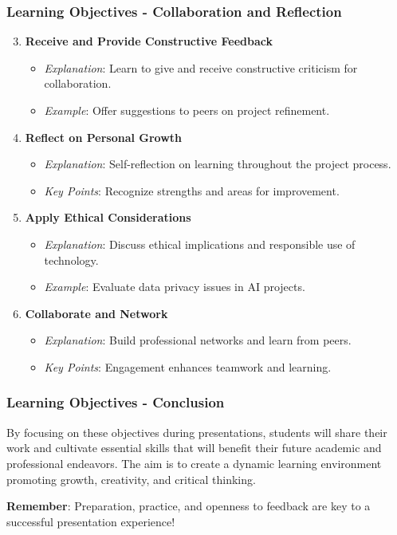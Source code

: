 \documentclass{beamer}
\begin{document}
\begin{frame}[fragile]
    \frametitle{Learning Objectives - Collaboration and Reflection}
    \begin{enumerate}
        \setcounter{enumi}{2}
        \item \textbf{Receive and Provide Constructive Feedback}
            \begin{itemize}
                \item \textit{Explanation}: Learn to give and receive constructive criticism for collaboration.
                \item \textit{Example}: Offer suggestions to peers on project refinement.
            \end{itemize}
        
        \item \textbf{Reflect on Personal Growth}
            \begin{itemize}
                \item \textit{Explanation}: Self-reflection on learning throughout the project process.
                \item \textit{Key Points}: Recognize strengths and areas for improvement.
            \end{itemize}

        \item \textbf{Apply Ethical Considerations}
            \begin{itemize}
                \item \textit{Explanation}: Discuss ethical implications and responsible use of technology.
                \item \textit{Example}: Evaluate data privacy issues in AI projects.
            \end{itemize}
        
        \item \textbf{Collaborate and Network}
            \begin{itemize}
                \item \textit{Explanation}: Build professional networks and learn from peers.
                \item \textit{Key Points}: Engagement enhances teamwork and learning.
            \end{itemize}
    \end{enumerate}
\end{frame}

\begin{frame}[fragile]
    \frametitle{Learning Objectives - Conclusion}
    By focusing on these objectives during presentations, students will share their work and cultivate essential skills that will benefit their future academic and professional endeavors. 
    The aim is to create a dynamic learning environment promoting growth, creativity, and critical thinking.
    
    \textbf{Remember}: Preparation, practice, and openness to feedback are key to a successful presentation experience!
\end{frame}
\end{document}
